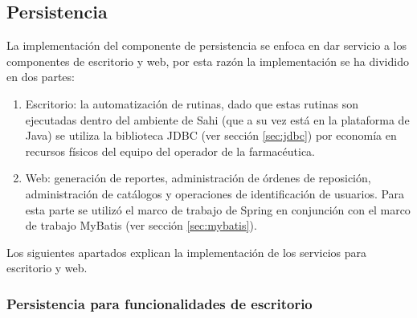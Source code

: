 \subsection{Persistencia}
La implementación del componente de persistencia se enfoca en dar servicio a los componentes de escritorio y web, por esta razón la implementación se ha dividido en dos partes:
\begin{enumerate}
 	\item Escritorio: la automatización de rutinas, dado que estas rutinas son ejecutadas dentro del ambiente de Sahi (que a su vez está en la plataforma de Java) se utiliza la biblioteca JDBC (ver sección \ref{sec:jdbc}) por economía en recursos físicos del equipo del operador de la farmacéutica.
 	\item Web: generación de reportes, administración de órdenes de reposición, administración de catálogos y operaciones de identificación  de usuarios. Para esta parte se utilizó el marco de trabajo de Spring en conjunción con el marco de trabajo MyBatis (ver sección \ref{sec:mybatis}).
\end{enumerate}
Los siguientes apartados explican la implementación de los servicios para escritorio y web.

\subsubsection{Persistencia para funcionalidades de escritorio}
